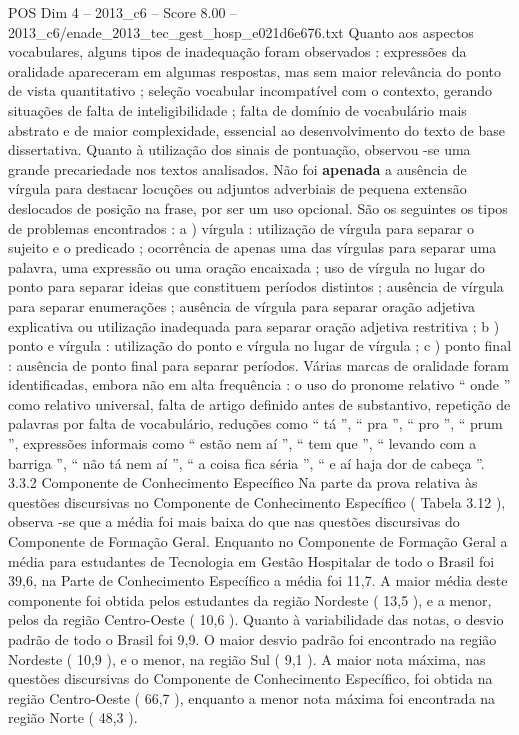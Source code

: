 \begin{textsample}{POS Dim 4 – 2013\_c6 – Score 8.00 – 2013\_c6/enade\_2013\_tec\_gest\_hosp\_e021d6e676.txt}
Quanto aos aspectos vocabulares, alguns tipos de inadequação foram observados : expressões da oralidade apareceram em algumas respostas, mas sem maior relevância do ponto de vista quantitativo ; seleção vocabular incompatível com o contexto, gerando situações de falta de inteligibilidade ; falta de domínio de vocabulário mais abstrato e de maior complexidade, essencial ao desenvolvimento do texto de base dissertativa.
Quanto à utilização dos sinais de pontuação, observou -se uma grande precariedade nos textos analisados.
Não foi \textbf{apenada} a ausência de vírgula para destacar locuções ou adjuntos adverbiais de pequena extensão deslocados de posição na frase, por ser um uso opcional.
São os seguintes os tipos de problemas encontrados : a ) vírgula : utilização de vírgula para separar o sujeito e o predicado ; ocorrência de apenas uma das vírgulas para separar uma palavra, uma expressão ou uma oração encaixada ; uso de vírgula no lugar do ponto para separar ideias que constituem períodos distintos ; ausência de vírgula para separar enumerações ; ausência de vírgula para separar oração adjetiva explicativa ou utilização inadequada para separar oração adjetiva restritiva ; b ) ponto e vírgula : utilização do ponto e vírgula no lugar de vírgula ; c ) ponto final : ausência de ponto final para separar períodos.
Várias marcas de oralidade foram identificadas, embora não em alta frequência : o uso do pronome relativo “ onde ” como relativo universal, falta de artigo definido antes de substantivo, repetição de palavras por falta de vocabulário, reduções como “ tá ”, “ pra ”, “ pro ”, “ prum ”, expressões informais como “ estão nem aí ”, “ tem que ”, “ levando com a barriga ”, “ não tá nem aí ”, “ a coisa fica séria ”, “ e aí haja dor de cabeça ”. 3.3.2 Componente de Conhecimento Específico Na parte da prova relativa às questões discursivas no Componente de Conhecimento Específico ( Tabela 3.12 ), observa -se que a média foi mais baixa do que nas questões discursivas do Componente de Formação Geral.
Enquanto no Componente de Formação Geral a média para estudantes de Tecnologia em Gestão Hospitalar de todo o Brasil foi 39,6, na Parte de Conhecimento Específico a média foi 11,7.
A maior média deste componente foi obtida pelos estudantes da região Nordeste ( 13,5 ), e a menor, pelos da região Centro-Oeste ( 10,6 ).
Quanto à variabilidade das notas, o desvio padrão de todo o Brasil foi 9,9.
O maior desvio padrão foi encontrado na região Nordeste ( 10,9 ), e o menor, na região Sul ( 9,1 ).
A maior nota máxima, nas questões discursivas do Componente de Conhecimento Específico, foi obtida na região Centro-Oeste ( 66,7 ), enquanto a menor nota máxima foi encontrada na região Norte ( 48,3 ).

\end{textsample}
